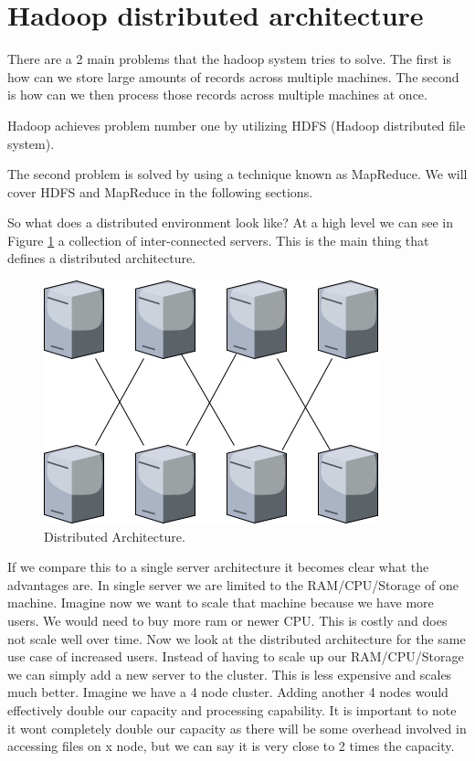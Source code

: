 \section{Hadoop distributed architecture}

There are a 2 main problems that the hadoop system tries to solve. 
The first is how can we store large amounts of records across multiple machines.
The second is how can we then process those records across multiple machines at once.

Hadoop achieves problem number one by utilizing HDFS (Hadoop distributed file system). 

The second problem is solved by using a technique known as MapReduce.
We will cover HDFS and MapReduce in the following sections. 

So what does a distributed environment look like? At a high level we can see in Figure \ref{fig:distributed} a collection of inter-connected servers. This is the main thing that defines a distributed architecture. 

\begin{figure}[H]
  \includegraphics[width=\linewidth]{./images/distributed.png}
  \caption{Distributed Architecture.}
  \label{fig:distributed}
\end{figure}

If we compare this to a single server architecture it becomes clear what the advantages are. In single server we are limited to the RAM/CPU/Storage of one machine. Imagine now we want to scale that machine because we have more users. We would need to buy more ram or newer CPU. This is costly and does not scale well over time. Now we look at the distributed architecture for the same use case of increased users. Instead of having to scale up our RAM/CPU/Storage we can simply add a new server to the cluster. This is less expensive and scales much better. Imagine we have a 4 node cluster. Adding another 4 nodes would effectively double our capacity and processing capability. It is important to note it wont completely double our capacity as there will be some overhead involved in accessing files on x node, but we can say it is very close to 2 times the capacity.
